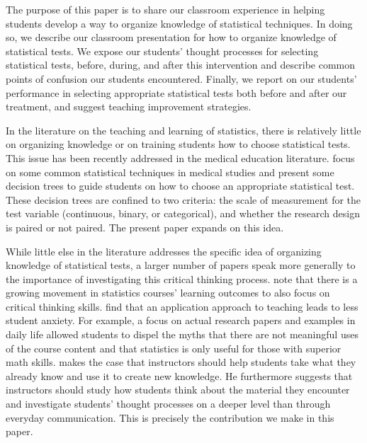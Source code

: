 \documentclass[12pt]{article}
\begin{document}
The purpose of this paper is to share our classroom experience in helping students develop a way to organize knowledge of statistical techniques.  In doing so, we describe our classroom presentation for how to organize knowledge of statistical tests.  We expose our students' thought processes for selecting statistical tests, before, during, and after this intervention and describe common points of confusion our students encountered.  Finally, we report on our students' performance in selecting appropriate statistical tests both before and after our treatment, and suggest teaching improvement strategies.

In the literature on the teaching and learning of statistics, there is relatively little on organizing knowledge or on training students how to choose statistical tests.  This issue has been recently addressed in the medical education literature.  \citet{medpaper} focus on some common statistical techniques in medical studies and present some decision trees to guide students on how to choose an appropriate statistical test.  These decision trees are confined to two criteria: the scale of measurement for the test variable (continuous, binary, or categorical), and whether the research design is paired or not paired.  The present paper expands on this idea.

While little else in the literature addresses the specific idea of organizing knowledge of statistical tests, a larger number of papers speak more generally to the importance of investigating this critical thinking process.  \citet*{garfield2000} note that there is a growing movement in statistics courses' learning outcomes to also focus on critical thinking skills.  \citet*{pantang} find that an application approach to teaching leads to less student anxiety.  For example, a focus on actual research papers and examples in daily life allowed students to dispel the myths that there are not meaningful uses of the course content and that statistics is only useful for those with superior math skills.  \citet*{mvududu2005} makes the case that instructors should help students take what they already know and use it to create new knowledge.  He furthermore suggests that instructors should study how students think about the material they encounter and investigate students' thought processes on a deeper level than through everyday communication.  This is precisely the contribution we make in this paper.
\end{document}
